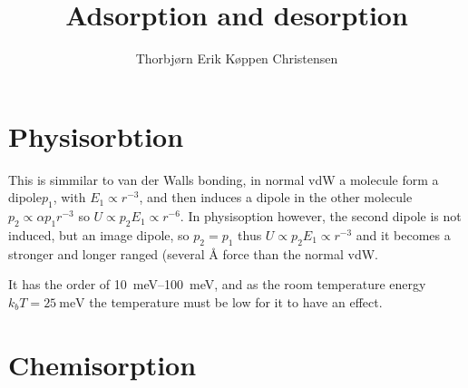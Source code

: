 \documentclass[article,oneside]{memoir}
\title{Adsorption and desorption}
\author{Thorbjørn Erik Køppen Christensen}
\begin{document}
\chapter{Physisorbtion}
This is simmilar to van der Walls bonding, in normal vdW a molecule form a dipole$p_1$, with $E_1\propto r^{-3}$, and then induces a dipole in the other molecule $p_2\propto \alpha p_{1}r^{-3}$ so $U\propto p_{2}E_{1}\propto r^{-6}$.
In physisoption however, the second dipole is not induced, but an image dipole, so $p_2 =p_1$ thus $U\propto p_2 E_{1}\propto r^{-3}$ and it becomes a stronger and longer ranged (several \si{\angstrom} force than the normal vdW.

It has the order of \SIrange{10}{100}{\milli\eV}, and as the room temperature energy $k_bT=\SI{25}{\milli\eV}$ the temperature must be low for it to have an effect.


\chapter{Chemisorption}
\end{document}
